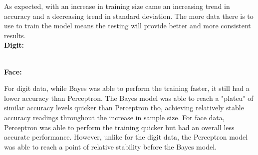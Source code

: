 \documentclass[12pt]{article}
\begin{document}
As expected, with an increase in training size came an increasing trend in accuracy and a decreasing trend in standard deviation. The more data there is to use to train the model means the testing will provide better and more consistent results. 
\\
\textbf{Digit:}
\begin{table}[h]
    \centering
    \end{table}
\\
\textbf{Face:}
\begin{table}[h]
    \centering
    \end{table}

\noindent
For digit data, while Bayes was able to perform the training faster, it still had a lower accuracy than Perceptron. The Bayes model was able to reach a "plateu" of similar accuracy levels quicker than Perceptron tho, achieving relatively stable accuracy readings throughout the increase in sample size. 
For face data, Perceptron was able to perform the training quicker but had an overall less accurate performance. However, unlike for the digit data, the Perceptron model was able to reach a point of relative stability before the Bayes model. 
\end{document}
